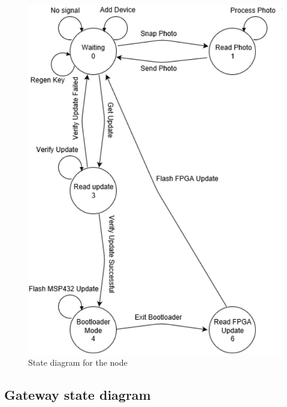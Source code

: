 \documentclass[11pt]{article}
\begin{document}
\begin{figure}[!ht]
\centering
\includegraphics[scale = 0.35]{nodestate.png}
\caption{State diagram for the node}
\end{figure}
\FloatBarrier
\subsection{Gateway state diagram}
\end{document}

